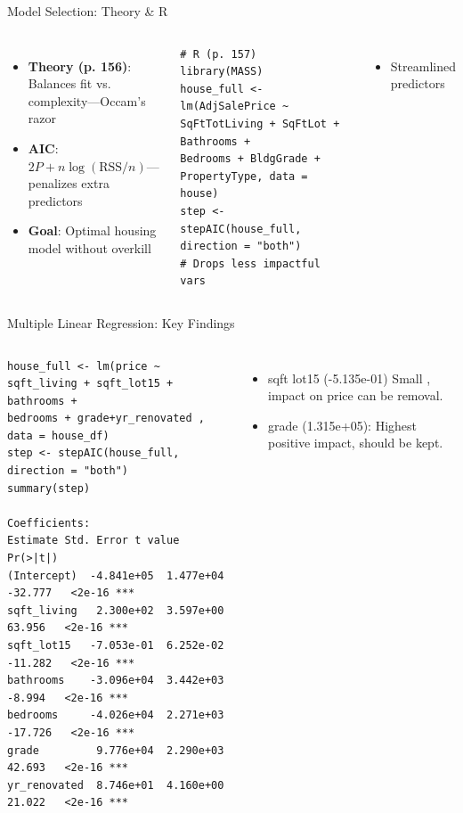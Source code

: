 \documentclass{beamer}
\begin{document}
	\begin{frame}[fragile]{Model Selection: Theory \& R}
		\begin{columns}
			\begin{itemize}
				\item \textbf{Theory (p. 156)}: Balances fit vs. complexity—Occam’s razor
				\item \textbf{AIC}: $2P + n\log(\text{RSS}/n)$—penalizes extra predictors
				\item \textbf{Goal}: Optimal housing model without overkill
			\end{itemize}
			\begin{lstlisting}
# R (p. 157)
library(MASS)
house_full <- lm(AdjSalePrice ~ SqFtTotLiving + SqFtLot + Bathrooms +
Bedrooms + BldgGrade + PropertyType, data = house)
step <- stepAIC(house_full, direction = "both")
# Drops less impactful vars
			\end{lstlisting}
			\begin{itemize}
				\item Streamlined predictors
			\end{itemize}
		\end{columns}
	\end{frame}

	\begin{frame}[fragile]{Multiple Linear Regression: Key Findings}
	\begin{columns}
		\column{0.9\textwidth}
		\begin{lstlisting}
house_full <- lm(price ~ sqft_living + sqft_lot15 + bathrooms +
bedrooms + grade+yr_renovated , data = house_df)
step <- stepAIC(house_full, direction = "both")
summary(step)

Coefficients:
Estimate Std. Error t value Pr(>|t|)    
(Intercept)  -4.841e+05  1.477e+04 -32.777   <2e-16 ***
sqft_living   2.300e+02  3.597e+00  63.956   <2e-16 ***
sqft_lot15   -7.053e-01  6.252e-02 -11.282   <2e-16 ***
bathrooms    -3.096e+04  3.442e+03  -8.994   <2e-16 ***
bedrooms     -4.026e+04  2.271e+03 -17.726   <2e-16 ***
grade         9.776e+04  2.290e+03  42.693   <2e-16 ***
yr_renovated  8.746e+01  4.160e+00  21.022   <2e-16 ***

		\end{lstlisting}
		\begin{itemize}
      		\item sqft lot15 (-5.135e-01) Small , impact on price can be removal.
			\item grade (1.315e+05): Highest positive impact, should be kept.
	\end{itemize}
	\end{columns}
	\end{frame}
	
\end{document}
